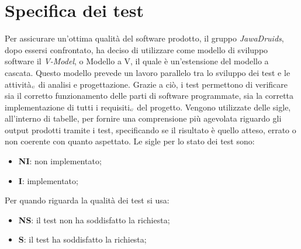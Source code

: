 \chapter{Specifica dei test} \label{SpecificaDeiTest}

Per assicurare un’ottima qualità del software prodotto, il gruppo \textit{JawaDruids}, dopo essersi confrontato, ha deciso di utilizzare come modello di sviluppo software il \textit{V-Model}, o Modello a V, il quale è un’estensione del modello a cascata.
Questo modello prevede un lavoro parallelo tra lo sviluppo dei test e le attività$_{\scaleto{G}{3pt}}$ di analisi e progettazione.
Grazie a ciò, i test permettono di verificare sia il corretto funzionamento delle parti di software programmate, sia la corretta implementazione di tutti i requisiti$_{\scaleto{G}{3pt}}$ del progetto.
Vengono utilizzate delle sigle, all’interno di tabelle, per fornire una comprensione più agevolata riguardo gli output prodotti tramite i test, specificando se il risultato è quello atteso, errato o non coerente con quanto aspettato.
Le sigle per lo stato dei test sono:
\begin{itemize}
	\item \textbf{NI}: non implementato;
	\item \textbf{I}: implementato;
\end{itemize}
Per quando riguarda la qualità dei test si usa:
\begin{itemize}
	\item \textbf{NS}: il test non ha soddisfatto la richiesta;
	\item \textbf{S}: il test ha soddisfatto la richiesta; 
\end{itemize}

